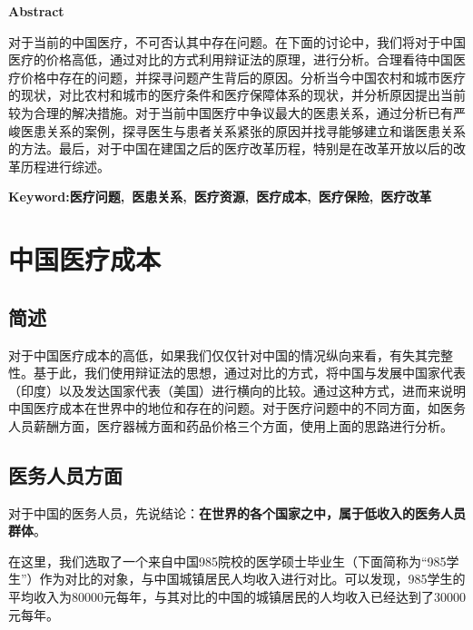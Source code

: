 \documentclass[11pt,twoside,a4paper]{article}
\begin{document}
	\newpage
	\begin{center}
	\textbf{Abstract}	
	\end{center}
		对于当前的中国医疗，不可否认其中存在问题。在下面的讨论中，我们将对于中国医疗的价格高低，通过对比的方式利用辩证法的原理，进行分析。合理看待中国医疗价格中存在的问题，并探寻问题产生背后的原因。分析当今中国农村和城市医疗的现状，对比农村和城市的医疗条件和医疗保障体系的现状，并分析原因提出当前较为合理的解决措施。对于当前中国医疗中争议最大的医患关系，通过分析已有严峻医患关系的案例，探寻医生与患者关系紧张的原因并找寻能够建立和谐医患关系的方法。最后，对于中国在建国之后的医疗改革历程，特别是在改革开放以后的改革历程进行综述。
	\begin{flushleft}
	\textbf{Keyword:医疗问题,\ 医患关系,\ 医疗资源,\ 医疗成本,\ 医疗保险,\ 医疗改革}
	\end{flushleft}

	\newpage
	
	\tableofcontents
	
	\newpage
	
	\section{中国医疗成本}
		\subsection{简述}
		对于中国医疗成本的高低，如果我们仅仅针对中国的情况纵向来看，有失其完整性。基于此，我们使用辩证法的思想，通过对比的方式，将中国与发展中国家代表（印度）以及发达国家代表（美国）进行横向的比较。通过这种方式，进而来说明中国医疗成本在世界中的地位和存在的问题。对于医疗问题中的不同方面，如医务人员薪酬方面，医疗器械方面和药品价格三个方面，使用上面的思路进行分析。
		\subsection{医务人员方面}
		对于中国的医务人员，先说结论：\textbf{在世界的各个国家之中，属于低收入的医务人员群体}。
		
		在这里，我们选取了一个来自中国985院校的医学硕士毕业生（下面简称为“985学生”）作为对比的对象，与中国城镇居民人均收入进行对比。可以发现，985学生的平均收入为$80000$元每年，与其对比的中国的城镇居民的人均收入已经达到了$30000$元每年。
		
\end{document}
